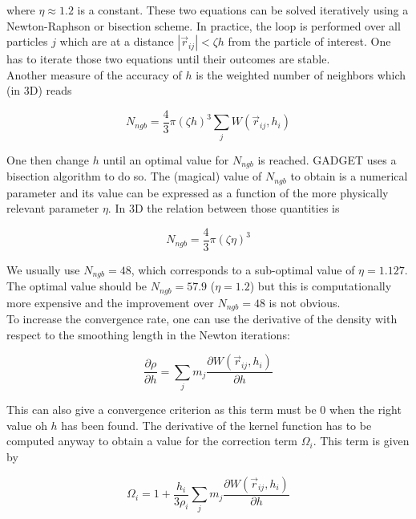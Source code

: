 \documentclass[a4paper,10pt]{report}
\begin{document}
where $\eta \approx 1.2$ is a constant. These two equations can be solved iteratively using a Newton-Raphson or
bisection scheme. In practice, the loop is performed over all particles $j$ which are at a distance
$|\vec{r}_{ij}|<\zeta
h$ from the particle of interest. One has to iterate those two equations until their outcomes are stable.\\
Another measure of the accuracy of $h$ is the weighted number of neighbors which (in 3D) reads

\begin{equation}
 N_{ngb} = \frac{4}{3}\pi \left(\zeta h\right)^3 \sum_j W(\vec{r}_{ij},h_i)
\end{equation}

One then change $h$ until an optimal value for $N_{ngb}$ is reached. GADGET uses a bisection algorithm to do so.
The (magical) value of $N_{ngb}$ to obtain is a numerical parameter and its value can be expressed as a function of the
more physically relevant parameter $\eta$. In 3D the relation between those quantities is

\begin{equation}
 N_{ngb} = \frac{4}{3}\pi\left(\zeta \eta\right)^3
\end{equation}

We usually use $N_{ngb} = 48$, which corresponds to a sub-optimal value of $\eta=1.127$. The optimal value should be
$N_{ngb}=57.9$ ($\eta=1.2$) but this is computationally more expensive and the improvement over $N_{ngb}=48$ is not
obvious.\\ 

To increase the convergence rate, one can use the derivative of the density with respect to the smoothing length in the
Newton iterations:

\begin{equation}
 \frac{\partial \rho}{\partial h} = \sum_j m_j \frac{\partial W(\vec{r}_{ij},h_i)}{\partial h}
\end{equation}

This can also give a convergence criterion as this term must be $0$ when the right value oh $h$ has been found.
The derivative of the kernel function has to be computed anyway to obtain a value for the correction term $\Omega_i$.
This term is given by

\begin{equation}
  \Omega_i = 1 + \frac{h_i}{3\rho_i}\sum_j m_j\frac{\partial W(\vec{r}_{ij},h_i)}{\partial h}
\end{equation}
\end{document}
